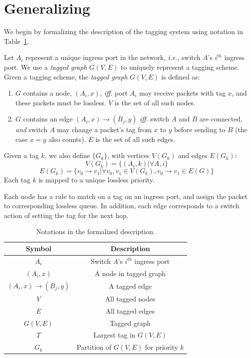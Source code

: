 \section{Generalizing \sysname{}}
\label{sec:generic}

We begin by  formalizing the description of the tagging system using notation in
Table~\ref{tab:symbols}.

Let $A_i$ represent a unique ingress port in the network, {\em i.e.,} switch
$A$'s $i^{th}$ ingress port.  We use a {\em tagged graph} $G(V,E)$ to uniquely
represent a tagging scheme.  Given a tagging scheme, the {\em tagged graph}
$G(V,E)$ is defined as:

\begin{enumerate}
\item $G$ contains a node, $(A_i, x)$, {\em iff.} port $A_i$ may receive packets with tag $x$, and these packets must
be lossless. $V$ is the set of all such nodes.

\item $G$ contains an edge $(A_i, x)\rightarrow(B_j, y)$ {\em iff.} switch $A$ and $B$ are
connected, {\em and} switch $A$ may change a packet's tag from $x$ to $y$ before sending to $B$ (the case $x=y$ also counts).
$E$ is the set of all such edges.

\end{enumerate}

Given a tag $k$, we also define $\{G_k\}$, with vertices $V(G_k)$ and edges
$E(G_k)$:
$$V(G_k) = \{(A_i, k) | \forall A, i\} $$
$$E(G_k) = \{v_0 \rightarrow v_1 | \forall v_0, v_1 \in V(G_k),  v_0 \rightarrow v_1 \in E(G)\} $$
Each tag $k$ is mapped to a unique lossless priority.

Each node has a rule to match on a tag on an ingress port, and assign the packet
to corresponding lossless queue.  In addition, each edge corresponds to a switch
action of setting the tag for the next hop.

\begin{table}[t]
\small
\centering
\begin{tabular}{|c|c|}
\hline
Symbol & Description \\ \hline
$A_i$ & Switch $A$'s $i^{th}$ ingress port  \\ \hline
$(A_i, x)$ & A node in tagged graph \\ \hline
$(A_i, x)\rightarrow(B_j, y)$ & A tagged edge \\ \hline
$V$ & All tagged nodes  \\ \hline
$E$ & All tagged edges \\ \hline
$G(V, E)$ & Tagged graph \\ \hline
$T$ & Largest tag in $G(V,E)$ \\ \hline
$G_k$ & Partition of $G(V,E)$ for priority $k$ \\ \hline
\end{tabular}
\vspace{-1em}
\caption{Notations in the formalized description.}
\label{tab:symbols}
		\vspace{-1em}
\end{table}

